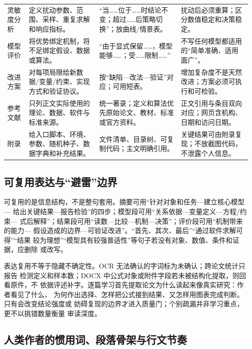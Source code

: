 \documentclass[UTF8,a4paper,12pt]{ctexart}
\begin{document}
\begin{longtable}{p{1.8cm}p{4.2cm}p{4.0cm}p{4.0cm}}
灵敏度分析 & 定义扰动参数、范围、采样、重复求解和响应指标。 & “当……位于……时结论不变；超过……后策略切换”；放曲线/情景表。 & 扰动后必须重算；区分数值稳定和决策稳定。\\
模型评价 & 将优势绑定机制，将不足绑定假设、数据或算法。 & “由于显式保留……，模型能够……；受……限制……” & 不写任何模型都适用的“简单准确、适用面广”。\\
改进方案 & 对每项局限给新数据/变量/约束、实现方式和验证协议。 & 按“缺陷—改法—验证”对应；可用短表。 & 增加复杂度不是天然改进；方案必须可执行和可检验。\\
参考文献 & 只列正文实际使用的理论、数据、软件与标准来源。 & 统一著录；定义和算法优先原始论文、教材、标准或官方资料。 & 正文引用与条目双向对应；网页含机构、日期和访问日期。\\
附录 & 给入口脚本、环境、参数、随机种子、数据字典和补充结果。 & 文件清单、目录树、可复制代码；主文明确引用。 & 关键结果可由附录复现；不放截图代码，不泄露个人信息。\\
\bottomrule
\end{longtable}

\subsection{可复用表达与“避雷”边界}

可复用的是信息结构，不是整句套用。摘要可用“针对对象和任务—建立核心模型—
给出关键结果—报告检验”的四步；模型段可用“关系依据—变量定义—方程/约束—
式后解释”；结果段可用“读数—比较—机制—决策”；评价段可用“机制带来的能力—
假设造成的边界—可验证改进”。“首先、其次、最后”“通过软件求解可得”“结果
较为理想”“模型具有较强普适性”等句子若没有对象、数值、条件和证据，应删除
或改写。

表达复用不等于隐藏不确定性。OCR 无法确认的字词标为未确认；跨论文统计只报告
检测定义和样本数；DOCX 中公式对象或附件字段若未被结构化提取，则回看原件，不
依据评述补字。逐篇学习首先提取论文为什么读起来像真实研究：作者看见了什么、
为何作出选择、怎样把公式接到结果、又怎样用图表完成判断。只有会改变结论强度或
妨碍复现的边界才进入质量门；个别疏漏并非学习重点，更不以挑错数量衡量
审读深度。

\subsection{人类作者的惯用词、段落骨架与行文节奏}
\end{document}
